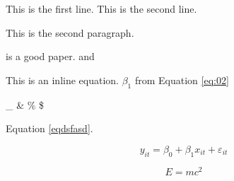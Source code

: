 This is the first line.
This is the second line.

This is the second paragraph.

\citet{DeFond2014} is a good paper.
\citet{Barbaranelli2007} and \citep{Barbaranelli2007}

This is an inline equation. $\beta_1$ from Equation \eqref{eq:02}

\_ \& \% \$

Equation \eqref{eqdsfasd}.

\begin{equation}
    \label{eq:02}
    y_{it} = \beta_0 + \beta_1 x_{it} + \varepsilon_{it}
\end{equation}

\begin{equation}
    \label{eqdsfasd}
    E = mc^2
\end{equation}